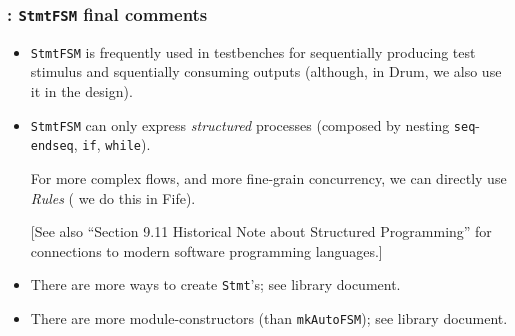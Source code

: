 \begin{frame}[fragile]
\frametitle{{\BSV}: {\tt StmtFSM} final comments}

\footnotesize

\begin{itemize}
        
 \item {\tt StmtFSM} is frequently used in testbenches for
        sequentially producing test stimulus and squentially consuming
        outputs (although, in Drum, we also use it in the design).

 \item {\tt StmtFSM} can only express \emph{structured} processes
       (composed by nesting {\tt seq}-{\tt endseq}, {\tt if}, {\tt while}).

       For more complex flows, and more fine-grain concurrency, we can
       directly use {\BSV} \emph{Rules} ({\eg} we do this in Fife).

       \vspace{1ex}

       {\scriptsize [See also ``Section 9.11 Historical Note about Structured Programming''
        for connections to modern software programming languages.]}

\end{itemize}

\PAUSE{\vspace{5ex}}

\begin{itemize}
        
 \item There are more ways to create {\tt Stmt}'s; see {\bsc} library document.

 \item There are more module-constructors (than {\tt mkAutoFSM}); see {\bsc} library document.

\end{itemize}

\end{frame}






